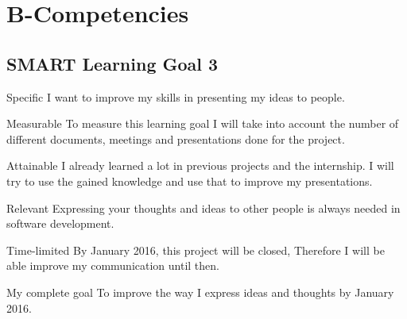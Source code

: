 \documentclass[12pt]{article}
\begin{document}
\section{B-Competencies}

\subsection{SMART Learning Goal 3}
\begin{SMART}
    \item[Specific] I want to improve my skills in presenting my ideas to people.
    \item[Measurable] To measure this learning goal I will take into account the number of different documents, meetings and presentations done for the project.
    \item[Attainable] I already learned a lot in previous projects and the internship. I will try to use the gained knowledge and use that to improve my presentations.
    \item[Relevant] Expressing your thoughts and ideas to other people is always needed in software development.
    \item[Time-limited] By January 2016, this project will be closed, Therefore I will be able improve my communication until then.
    \item[My complete goal] To improve the way I express ideas and thoughts by January 2016.
\end{SMART}
\end{document}
